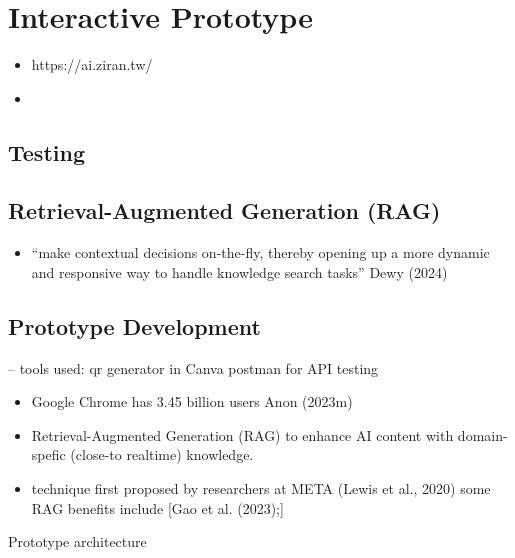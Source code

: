 \documentclass[
  letterpaper,
  DIV=11,
  numbers=noendperiod]{scrartcl}
\providecommand{\tightlist}{%
  \setlength{\itemsep}{0pt}\setlength{\parskip}{0pt}}\usepackage{longtable,booktabs,array}
\begin{document}
\newpage

\section{Interactive Prototype}\label{interactive-prototype}

\begin{itemize}
\tightlist
\item
  https://ai.ziran.tw/
\item
\end{itemize}

\subsection{Testing}\label{testing}

\subsection{Retrieval-Augmented Generation
(RAG)}\label{retrieval-augmented-generation-rag}

\begin{itemize}
\tightlist
\item
  ``make contextual decisions on-the-fly, thereby opening up a more
  dynamic and responsive way to handle knowledge search tasks'' Dewy
  (2024)
\end{itemize}

\subsection{Prototype Development}\label{prototype-development}

-- tools used: qr generator in Canva postman for API testing

\begin{itemize}
\item
  Google Chrome has 3.45 billion users Anon (2023m)
\item
  Retrieval-Augmented Generation (RAG) to enhance AI content with
  domain-spefic (close-to realtime) knowledge.
\item
  technique first proposed by researchers at META (Lewis et al., 2020)
  some RAG benefits include {[}Gao et al. (2023);{]}
\end{itemize}

Prototype architecture
\end{document}
